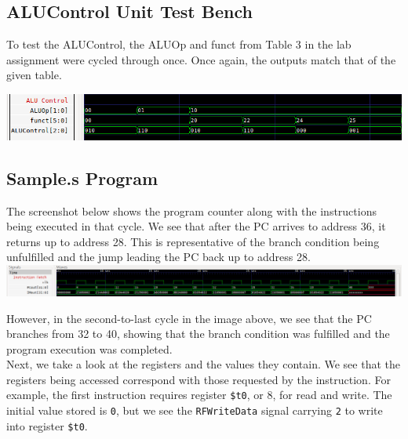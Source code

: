 \documentclass[twocolumn]{article}
\newcommand{\cc}[1]{\texttt{#1}}
\begin{document}
\subsection{ALUControl Unit Test Bench}

To test the ALUControl, the ALUOp and funct from Table 3 in the lab assignment were cycled through once. Once again, the outputs match that of the given table.

\begingroup
    \centering
    \medskip
    \includegraphics[width=\columnwidth]{Lab-Tex/Lab5-images/t2.png}
    \medskip
\endgroup

\subsection{Sample.s Program}

The screenshot below shows the program counter along with the instructions being executed in that cycle. We see that after the PC arrives to address 36, it returns up to address 28. This is representative of the branch condition being unfulfilled and the jump leading the PC back up to address 28. \\

\begingroup
    \centering
    \medskip
    \includegraphics[width=\columnwidth]{Lab-Tex/Lab5-images/p1.png}
    \medskip
\endgroup

However, in the second-to-last cycle in the image above, we see that the PC branches from 32 to 40, showing that the branch condition was fulfilled and the program execution was completed. \\

Next, we take a look at the registers and the values they contain. We see that the registers being accessed correspond with those requested by the instruction. For example, the first instruction requires register \cc{\$t0}, or 8, for read and write. The initial value stored is \cc{0}, but we see the \cc{RFWriteData} signal carrying \cc{2} to write into register \cc{\$t0}. \\
\end{document}
